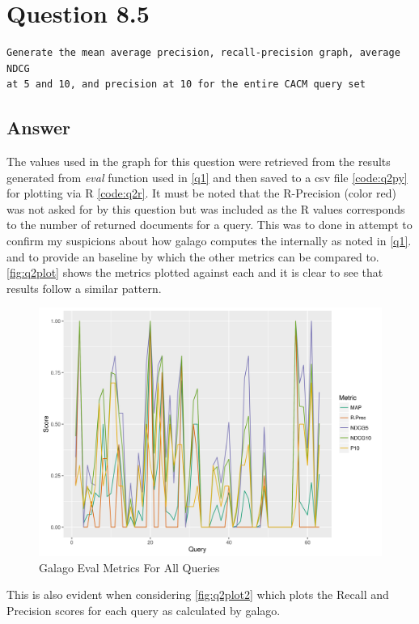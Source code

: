 \documentclass[11pt]{article}
\begin{document}
\section{Question 8.5} \label{q2}
\begin{verbatim}
Generate the mean average precision, recall-precision graph, average NDCG
at 5 and 10, and precision at 10 for the entire CACM query set
\end{verbatim}
\subsection{Answer} 
The values used in the graph for this question were retrieved from the results generated from \textit{eval} function used in \autoref{q1} and then saved to a csv file \autoref{code:q2py} for plotting via R \autoref{code:q2r}. It must be noted that the R-Precision (color red) was not asked for by this question but was included as the R values corresponds to the number of returned documents for a query. This was to done in attempt to confirm my suspicions about how galago computes the internally as noted in \autoref{q1}. and to provide an baseline by which the other metrics can be compared to.
 \autoref{fig:q2plot} shows the metrics plotted against each and it is clear to see that results follow a similar pattern.
\begin{figure}[H]
\centering
\includegraphics[scale=0.9]{q2_plot.png}
\caption{Galago Eval Metrics For All Queries}
\label{fig:q2plot}
\end{figure}
This is also evident when considering \autoref{fig:q2plot2} which plots the Recall and Precision scores for each query as calculated by galago. 
\end{document}
